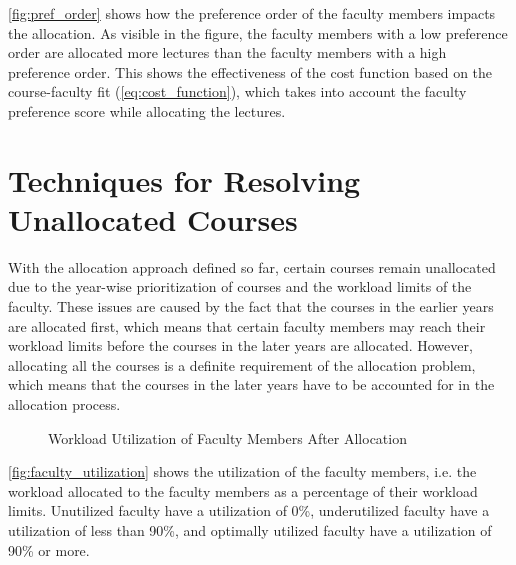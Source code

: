 \autoref{fig:pref_order} shows how the preference order of the faculty members impacts the allocation. As visible in the figure, the faculty members with a low preference order are allocated more lectures than the faculty members with a high preference order. This shows the effectiveness of the cost function based on the course-faculty fit (\autoref{eq:cost_function}), which takes into account the faculty preference score while allocating the lectures.

\section{Techniques for Resolving Unallocated Courses}
\label{sec:rectifying_unallocated_courses}

With the allocation approach defined so far, certain courses remain unallocated due to the year-wise prioritization of courses and the workload limits of the faculty. These issues are caused by the fact that the courses in the earlier years are allocated first, which means that certain faculty members may reach their workload limits before the courses in the later years are allocated. However, allocating all the courses is a definite requirement of the allocation problem, which means that the courses in the later years have to be accounted for in the allocation process.

\begin{figure}[H]
  \centering
  \caption{Workload Utilization of Faculty Members After Allocation}
  \label{fig:faculty_utilization}
\end{figure}

\autoref{fig:faculty_utilization} shows the utilization of the faculty members, i.e. the workload allocated to the faculty members as a percentage of their workload limits. Unutilized faculty have a utilization of 0\%, underutilized faculty have a utilization of less than 90\%, and optimally utilized faculty have a utilization of 90\% or more.

